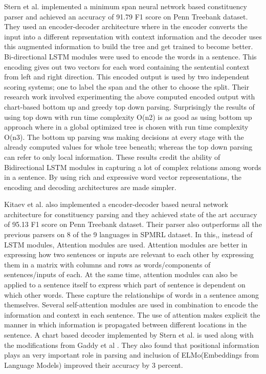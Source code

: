 \documentclass[a4paper, 11pt]{article}
\begin{document}
Stern et al. \parencite*{Stern2017} implemented a minimum span neural network based constituency parser and achieved an accuracy of 91.79 F1 score on Penn Treebank dataset. They used an encoder-decoder architecture where in the encoder converts the input into a different reprsentation with context information and the decoder uses this augmented information to build the tree and get trained to become better. Bi-directional LSTM modules were used to encode the words in a sentence. This encoding gives out two vectors for each word containing the sentential context from left and right direction. This encoded output is used by two independent scoring systems; one to label the span and the other to choose the split. Their research work involved experimenting the above computed encoded output with chart-based bottom up and greedy top down parsing. Surprisingly the results of using top down with run time complexity O(n2) is as good as using bottom up approach where in a global optimized tree is chosen with run time complexity O(n3). The bottom up parsing was making decisions at every stage with the already computed values for whole tree beneath; whereas the top down parsing can refer to only local information. These results credit the ability of Bidirectional LSTM modules in capturing a lot of complex relations among words in a sentence. By using rich and expressive word vector representations, the encoding and decoding architectures are made simpler. 

Kitaev et al. \parencite*{Kitaev2019} also implemented a encoder-decoder based neural network architecture for constituency parsing and they achieved state of the art accuracy of 95.13 F1 score on Penn Treebank dataset. Their parser also outperforms all the previous parsers on 8 of the 9 languages in SPMRL dataset. In this,, instead of LSTM modules, Attention modules \parencite*{Vaswani2017} are used. Attention modules are better in expressing how two sentences or inputs are relevant to each other by expressing them in a matrix with columns and rows as words/components of sentences/inputs of each. At the same time, attention modules can also be applied to a sentence itself to express which part of sentence is dependent on which other words. These capture the relationships of words in a sentence among themselves. Several self-attention modules are used in combination to encode the information and context in each sentence. The use of attention makes explicit the manner in which information is propagated between different locations in the sentence. A chart based decoder implemented by Stern et al. \parencite*{Stern2017} is used along with the modifications from Gaddy et al \parencite*{Gaddy2018}. They also found that positional information plays an very important role in parsing and inclusion of ELMo(Embeddings from Language Models) improved their accuracy by 3 percent. 
\end{document}
